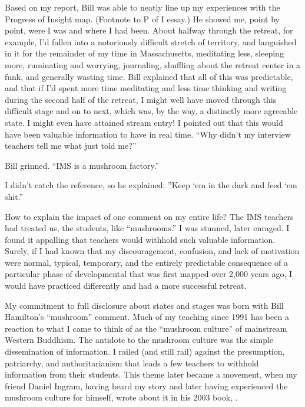 \documentclass[a5paper,10pt,english]{book}
\begin{document}
\sphinxAtStartPar
Based on my report, Bill was able to neatly line up my experiences with
the Progress of Insight map. (Footnote to P of I essay.) He showed me,
point by point, were I was and where I had been. About halfway through
the retreat, for example, I’d fallen into a notoriously difficult
stretch of territory, and languished in it for the remainder of my time
in Massachusetts, meditating less, sleeping more, ruminating and
worrying, journaling, shuffling about the retreat center in a funk, and
generally wasting time. Bill explained that all of this was predictable,
and that if I’d spent more time meditating and less time thinking and
writing during the second half of the retreat, I might well have moved
through this difficult stage and on to next, which was, by the way, a
distinctly more agreeable state. I might even have attained stream
entry! I pointed out that this would have been valuable information to
have in real time. “Why didn’t my interview teachers tell me what 
just told me?”

\sphinxAtStartPar
Bill grinned. “IMS is a mushroom factory.”

\sphinxAtStartPar
I didn’t catch the reference, so he explained: ”Keep ‘em in the dark and
feed ‘em shit.”

\sphinxAtStartPar
How to explain the impact of one comment on my entire life? The IMS
teachers had treated us, the students, like “mushrooms.” I was stunned,
later enraged. I found it appalling that teachers would withhold such
valuable information. Surely, if I had known that my discouragement,
confusion, and lack of motivation were normal, typical, temporary, and
the entirely predictable consequence of a particular phase of
developmental that was first mapped over 2,000 years ago, I would have
practiced differently and had a more successful retreat.

\sphinxAtStartPar
My commitment to full disclosure about states and stages was born with
Bill Hamilton’s “mushroom” comment. Much of my teaching since 1991 has
been a reaction to what I came to think of as the “mushroom culture” of
mainstream Western Buddhism. The antidote to the mushroom culture was
the simple dissemination of information. I railed (and still rail)
against the presumption, patriarchy, and authoritarianism that leads a
few teachers to withhold information from their students. This theme
later became a movement, when my friend Daniel Ingram, having heard my
story and later having experienced the mushroom culture for himself,
wrote about it in his 2003 book, .
\end{document}
